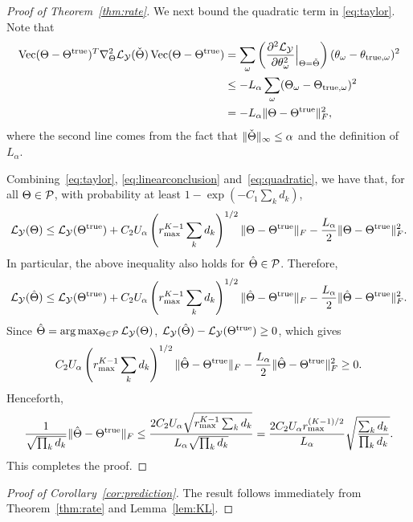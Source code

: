 \documentclass{article}
\theoremstyle{plain}
\theoremstyle{definition}
\begin{document}
\begin{proof}[Proof of Theorem~\ref{thm:rate}]
We next bound the quadratic term in \eqref{eq:taylor}. Note that
\begin{align}\label{eq:quadratic}
 \operatorname{Vec}(\Theta-\Theta^{\mathrm{true}})^T \nabla^2_{\Theta}\mathcal{L}_{\mathcal{Y}}(\check{\Theta})\operatorname{Vec}(\Theta-\Theta^{\mathrm{true}})&=\sum_\omega \left( {\partial^2\mathcal{L}_{\mathcal{Y}}\over \partial \theta^2_\omega} \Big|_{\Theta=\check\Theta} \right)(\theta_\omega-\theta_{{\text{true}},\omega})^2 \nonumber \\
&\leq - L_\alpha\sum_{\omega}(\Theta_{\omega}-\Theta_{\text{true},\omega})^2 \nonumber \\
&=-L_\alpha\lVert\Theta-\Theta^{\mathrm{true}}\rVert_F^2,
\end{align}
where the second line comes from the fact that  $\lVert\check\Theta\rVert_\infty\leq \alpha$ and the definition of $L_\alpha$.

Combining~\eqref{eq:taylor}, \eqref{eq:linearconclusion} and~\eqref{eq:quadratic}, we have that, for all $\Theta\in\mathcal{P}$, with probability at least $1-\exp(-C_1 \sum_kd_k)$,
\[
\mathcal{L}_{\mathcal{Y}}(\Theta)\leq \mathcal{L}_{\mathcal{Y}}(\Theta^{\mathrm{true}})+C_2U_\alpha  \left(r_{\max}^{K-1}\sum_k d_k\right)^{1/2}  \lVert\Theta-\Theta^{\mathrm{true}}\rVert_F-{L_\alpha\over 2}\lVert\Theta-\Theta^{\mathrm{true}}\rVert_F^2.
\]
In particular, the above inequality also holds for $\hat \Theta\in\mathcal{P}$. Therefore,
\[
\mathcal{L}_{\mathcal{Y}}(\hat \Theta)\leq \mathcal{L}_{\mathcal{Y}}(\Theta^{\mathrm{true}})+C_2U_\alpha \left(r_{\max}^{K-1}\sum_k d_k\right)^{1/2}  \lVert\hat \Theta-\Theta^{\mathrm{true}}\rVert_F-{L_\alpha\over 2} \lVert\hat \Theta-\Theta^{\mathrm{true}}\rVert_F^2.
\]
Since $\hat \Theta=\arg\max_{\Theta\in\mathcal{P}}\mathcal{L}_{\mathcal{Y}}(\Theta)$, $\mathcal{L}_{\mathcal{Y}}(\hat \Theta)-\mathcal{L}_{\mathcal{Y}}(\Theta^{\mathrm{true}})\geq 0$, which gives
\[
C_2U_\alpha \left(r_{\max}^{K-1}\sum_k d_k\right)^{1/2}  \lVert\hat \Theta-\Theta^{\mathrm{true}}\rVert_F-{L_\alpha\over 2}\lVert\hat \Theta-\Theta^{\mathrm{true}}\rVert_F^2\geq 0.
\]
Henceforth,
\[
{1\over \sqrt{\prod_k d_k}} \lVert\hat \Theta-\Theta^{\mathrm{true}}\rVert_F\leq {2C_2U_\alpha \sqrt{r_{\max}^{K-1}\sum_k d_k}\over L_\alpha \sqrt{\prod_k d_k}}={2C_2U_\alpha r_{\max}^{(K-1)/2}\over L_\alpha} \sqrt{ \sum_k d_k \over \prod_k d_k}.
\]
This completes the proof.
\end{proof}

\begin{proof}[Proof of Corollary~\ref{cor:prediction}]
The result follows immediately from Theorem~\ref{thm:rate} and Lemma~\ref{lem:KL}.
\end{proof}
\end{document}
